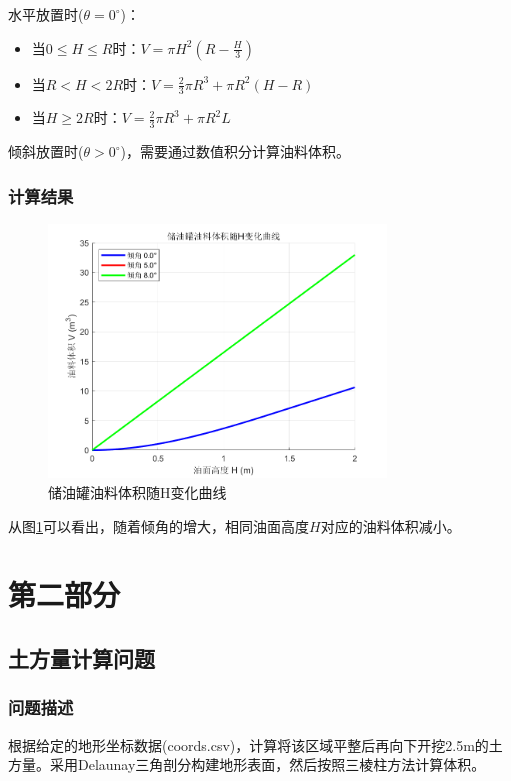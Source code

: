 \documentclass[fontset=windows,openright]{ctexrep}
\begin{document}
水平放置时($\theta=0^\circ$)：
\begin{itemize}
    \item 当$0 \leq H \leq R$时：$V = \pi H^2 \left(R - \frac{H}{3}\right)$
    \item 当$R < H < 2R$时：$V = \frac{2}{3}\pi R^3 + \pi R^2(H-R)$
    \item 当$H \geq 2R$时：$V = \frac{2}{3}\pi R^3 + \pi R^2 L$
\end{itemize}

倾斜放置时($\theta > 0^\circ$)，需要通过数值积分计算油料体积。

\subsection{计算结果}
\begin{figure}[h]
    \centering
    \includegraphics[width=0.8\textwidth]{oil_volume.png}
    \caption{储油罐油料体积随H变化曲线}
    \label{fig:oil_volume}
\end{figure}

从图\ref{fig:oil_volume}可以看出，随着倾角的增大，相同油面高度$H$对应的油料体积减小。

\chapter{第二部分}
\section{土方量计算问题}

\subsection{问题描述}
根据给定的地形坐标数据(coords.csv)，计算将该区域平整后再向下开挖2.5m的土方量。采用Delaunay三角剖分构建地形表面，然后按照三棱柱方法计算体积。
\end{document}
